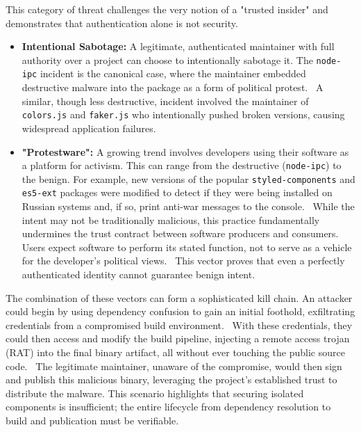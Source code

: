 \documentclass{article}
\begin{document}
This category of threat challenges the very notion of a "trusted insider" and demonstrates that authentication alone is not security.

\begin{itemize}
\item \textbf{Intentional Sabotage:} A legitimate, authenticated maintainer with full authority over a project can choose to intentionally sabotage it. The \lstinline{node-ipc} incident is the canonical case, where the maintainer embedded destructive malware into the package as a form of political protest.~\cite{cve-2022-23812} A similar, though less destructive, incident involved the maintainer of \lstinline{colors.js} and \lstinline{faker.js} who intentionally pushed broken versions, causing widespread application failures.~\cite{ohm2020backstabber}
\item \textbf{"Protestware":} A growing trend involves developers using their software as a platform for activism. This can range from the destructive (\lstinline{node-ipc}) to the benign. For example, new versions of the popular \lstinline{styled-components} and \lstinline{es5-ext} packages were modified to detect if they were being installed on Russian systems and, if so, print anti-war messages to the console.~\cite{ohm2020backstabber} While the intent may not be traditionally malicious, this practice fundamentally undermines the trust contract between software producers and consumers. Users expect software to perform its stated function, not to serve as a vehicle for the developer's political views.~\cite{ladisa2023sok} This vector proves that even a perfectly authenticated identity cannot guarantee benign intent.
\end{itemize}

The combination of these vectors can form a sophisticated kill chain. An attacker could begin by using dependency confusion to gain an initial foothold, exfiltrating credentials from a compromised build environment.~\cite{birsan2021dependency} With these credentials, they could then access and modify the build pipeline, injecting a remote access trojan (RAT) into the final binary artifact, all without ever touching the public source code.~\cite{cisa2020solarwinds} The legitimate maintainer, unaware of the compromise, would then sign and publish this malicious binary, leveraging the project's established trust to distribute the malware. This scenario highlights that securing isolated components is insufficient; the entire lifecycle from dependency resolution to build and publication must be verifiable.
\end{document}
